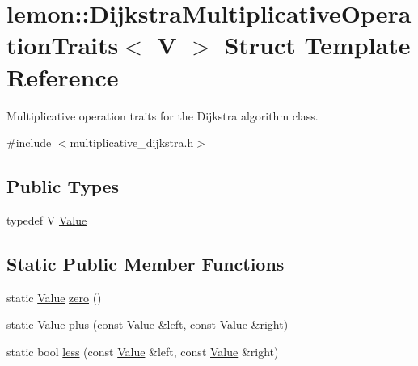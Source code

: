 \hypertarget{structlemon_1_1_dijkstra_multiplicative_operation_traits}{}\section{lemon\+:\+:Dijkstra\+Multiplicative\+Operation\+Traits$<$ V $>$ Struct Template Reference}
\label{structlemon_1_1_dijkstra_multiplicative_operation_traits}


Multiplicative operation traits for the Dijkstra algorithm class.  




{\ttfamily \#include $<$multiplicative\+\_\+dijkstra.\+h$>$}

\subsection*{Public Types}
\begin{DoxyCompactItemize}
\item 
typedef V \hyperlink{structlemon_1_1_dijkstra_multiplicative_operation_traits_a8832632b11125d59eedb238160bc1554}{Value}
\end{DoxyCompactItemize}
\subsection*{Static Public Member Functions}
\begin{DoxyCompactItemize}
\item 
static \hyperlink{structlemon_1_1_dijkstra_multiplicative_operation_traits_a8832632b11125d59eedb238160bc1554}{Value} \hyperlink{structlemon_1_1_dijkstra_multiplicative_operation_traits_a42a0a16398e1548efd8ffb3616b13866}{zero} ()
\item 
static \hyperlink{structlemon_1_1_dijkstra_multiplicative_operation_traits_a8832632b11125d59eedb238160bc1554}{Value} \hyperlink{structlemon_1_1_dijkstra_multiplicative_operation_traits_a5b8190dbafe5ad4fa70098dcc876c183}{plus} (const \hyperlink{structlemon_1_1_dijkstra_multiplicative_operation_traits_a8832632b11125d59eedb238160bc1554}{Value} \&left, const \hyperlink{structlemon_1_1_dijkstra_multiplicative_operation_traits_a8832632b11125d59eedb238160bc1554}{Value} \&right)
\item 
static bool \hyperlink{structlemon_1_1_dijkstra_multiplicative_operation_traits_a0e6d5f836763e814cb562d7f5e5be67f}{less} (const \hyperlink{structlemon_1_1_dijkstra_multiplicative_operation_traits_a8832632b11125d59eedb238160bc1554}{Value} \&left, const \hyperlink{structlemon_1_1_dijkstra_multiplicative_operation_traits_a8832632b11125d59eedb238160bc1554}{Value} \&right)
\end{DoxyCompactItemize}


